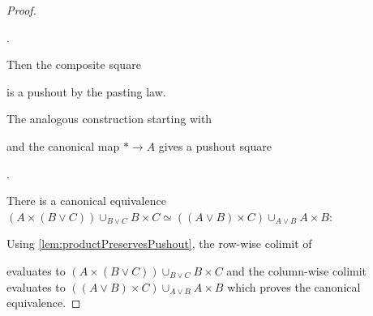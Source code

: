 \begin{lemma}
\begin{proof}
\begin{center}
\;.
        \end{center}
        Then the composite square
        \begin{center}
        \end{center}
        is a pushout by the pasting law.

        The analogous construction starting with 
        \begin{center}
        \end{center} 
        and the canonical map $*\to A$ gives a pushout square
        \begin{center}
            \;.
        \end{center}
        There is a canonical equivalence $\left(A\times(B\vee C)\right)\cup_{B\vee C} B\times C\simeq \left((A\vee B)\times C\right)\cup_{A\vee B} A\times B$:

        Using \cref{lem:productPreservesPushout}, the row-wise colimit of 
        \begin{center}
        \end{center}
        evaluates to $\left(A\times(B\vee C)\right)\cup_{B\vee C} B\times C$ and the column-wise colimit evaluates to $\left((A\vee B)\times C\right)\cup_{A\vee B}A\times B$ which proves the canonical equivalence.


\end{proof}
\end{lemma}
